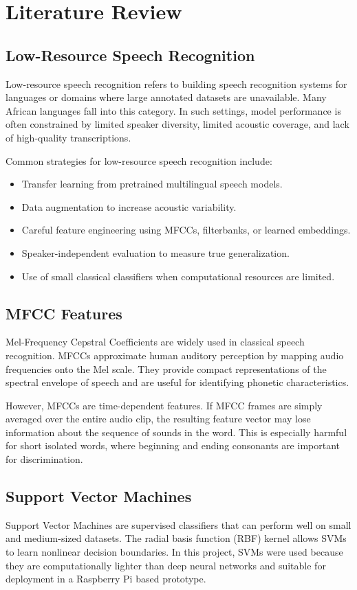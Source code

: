 \documentclass[12pt,a4paper]{report}
\begin{document}
\chapter{Literature Review}

\section{Low-Resource Speech Recognition}
Low-resource speech recognition refers to building speech recognition systems for languages or domains where large annotated datasets are unavailable. Many African languages fall into this category. In such settings, model performance is often constrained by limited speaker diversity, limited acoustic coverage, and lack of high-quality transcriptions.

Common strategies for low-resource speech recognition include:

\begin{itemize}
    \item Transfer learning from pretrained multilingual speech models.
    \item Data augmentation to increase acoustic variability.
    \item Careful feature engineering using MFCCs, filterbanks, or learned embeddings.
    \item Speaker-independent evaluation to measure true generalization.
    \item Use of small classical classifiers when computational resources are limited.
\end{itemize}

\section{MFCC Features}
Mel-Frequency Cepstral Coefficients are widely used in classical speech recognition. MFCCs approximate human auditory perception by mapping audio frequencies onto the Mel scale. They provide compact representations of the spectral envelope of speech and are useful for identifying phonetic characteristics.

However, MFCCs are time-dependent features. If MFCC frames are simply averaged over the entire audio clip, the resulting feature vector may lose information about the sequence of sounds in the word. This is especially harmful for short isolated words, where beginning and ending consonants are important for discrimination.

\section{Support Vector Machines}
Support Vector Machines are supervised classifiers that can perform well on small and medium-sized datasets. The radial basis function (RBF) kernel allows SVMs to learn nonlinear decision boundaries. In this project, SVMs were used because they are computationally lighter than deep neural networks and suitable for deployment in a Raspberry Pi based prototype.
\end{document}
